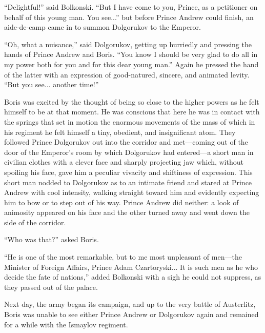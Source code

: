 ``Delightful!'' said Bolkonski. ``But I have come to you, Prince,
as a petitioner on behalf of this young man. You see...'' but
before Prince Andrew could finish, an aide-de-camp came in to
summon Dolgorukov to the Emperor.

``Oh, what a nuisance,'' said Dolgorukov, getting up hurriedly
and pressing the hands of Prince Andrew and Boris. ``You know I
should be very glad to do all in my power both for you and for
this dear young man.'' Again he pressed the hand of the latter
with an expression of good-natured, sincere, and animated
levity. ``But you see... another time!''

Boris was excited by the thought of being so close to the higher
powers as he felt himself to be at that moment. He was conscious
that here he was in contact with the springs that set in motion
the enormous movements of the mass of which in his regiment he
felt himself a tiny, obedient, and insignificant atom. They
followed Prince Dolgorukov out into the corridor and met---coming
out of the door of the Emperor's room by which Dolgorukov had
entered---a short man in civilian clothes with a clever face and
sharply projecting jaw which, without spoiling his face, gave him
a peculiar vivacity and shiftiness of expression. This short man
nodded to Dolgorukov as to an intimate friend and stared at
Prince Andrew with cool intensity, walking straight toward him
and evidently expecting him to bow or to step out of his
way. Prince Andrew did neither: a look of animosity appeared on
his face and the other turned away and went down the side of the
corridor.

``Who was that?'' asked Boris.

``He is one of the most remarkable, but to me most unpleasant of
men---the Minister of Foreign Affairs, Prince Adam
Czartoryski... It is such men as he who decide the fate of
nations,'' added Bolkonski with a sigh he could not suppress, as
they passed out of the palace.

Next day, the army began its campaign, and up to the very battle
of Austerlitz, Boris was unable to see either Prince Andrew or
Dolgorukov again and remained for a while with the Ismaylov
regiment.


